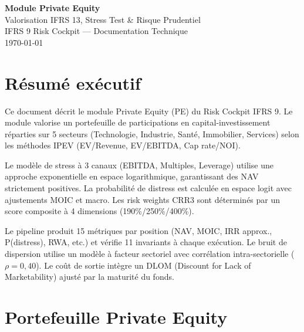 \documentclass[12pt,a4paper]{article}
\begin{document}
\begin{titlepage}
\centering
\vspace*{3cm}
{\Huge\bfseries\color{darkblue} Module Private Equity\\[0.5cm]}
{\Large\color{steelblue} Valorisation IFRS 13, Stress Test \& Risque Prudentiel\\[1cm]}
{\large\color{gray} IFRS 9 Risk Cockpit --- Documentation Technique\\[2cm]}
\vfill
{\large \today}
\end{titlepage}

\section*{R\'{e}sum\'{e} ex\'{e}cutif}

Ce document d\'{e}crit le module Private Equity (PE) du Risk Cockpit IFRS 9.
Le module valorise un portefeuille de participations en capital-investissement
r\'{e}parties sur 5 secteurs (Technologie, Industrie, Sant\'{e}, Immobilier, Services)
selon les m\'{e}thodes IPEV (EV/Revenue, EV/EBITDA, Cap rate/NOI).

Le mod\`{e}le de stress \`{a} 3 canaux (EBITDA, Multiples, Leverage) utilise une
approche exponentielle en espace logarithmique, garantissant des NAV strictement
positives. La probabilit\'{e} de distress est calcul\'{e}e en espace logit avec
ajustements MOIC et macro. Les risk weights CRR3 sont d\'{e}termin\'{e}s par un score
composite \`{a} 4 dimensions (190\%/250\%/400\%).

Le pipeline produit 15 m\'{e}triques par position (NAV, MOIC, IRR approx., P(distress),
RWA, etc.) et v\'{e}rifie 11 invariants \`{a} chaque ex\'{e}cution. Le bruit de dispersion
utilise un mod\`{e}le \`{a} facteur sectoriel avec corr\'{e}lation intra-sectorielle
($\rho = 0{,}40$). Le co\^{u}t de sortie int\`{e}gre un DLOM (Discount for Lack of
Marketability) ajust\'{e} par la maturit\'{e} du fonds.

\tableofcontents
\newpage

\section{Portefeuille Private Equity}
\label{sec:portfolio}
\end{document}
